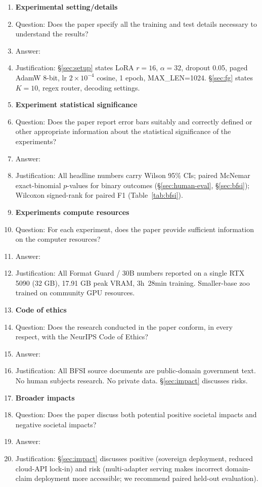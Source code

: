 \documentclass{article}
\begin{document}
\begin{enumerate}
\item {\bf Experimental setting/details}
    \item[] Question: Does the paper specify all the training and test details necessary to understand the results?
    \item[] Answer: \answerYes{}
    \item[] Justification: \S\ref{sec:setup} states LoRA $r=16$, $\alpha=32$, dropout 0.05, paged AdamW 8-bit, lr $2\times10^{-4}$ cosine, 1 epoch, MAX\_LEN=1024. \S\ref{sec:fg} states $K=10$, regex router, decoding settings.

\item {\bf Experiment statistical significance}
    \item[] Question: Does the paper report error bars suitably and correctly defined or other appropriate information about the statistical significance of the experiments?
    \item[] Answer: \answerYes{}
    \item[] Justification: All headline numbers carry Wilson 95\% CIs; paired McNemar exact-binomial $p$-values for binary outcomes (\S\ref{sec:human-eval}, \S\ref{sec:bfsi}); Wilcoxon signed-rank for paired F1 (Table~\ref{tab:bfsi}).

\item {\bf Experiments compute resources}
    \item[] Question: For each experiment, does the paper provide sufficient information on the computer resources?
    \item[] Answer: \answerYes{}
    \item[] Justification: All Format Guard / 30B numbers reported on a single RTX 5090 (32 GB), 17.91 GB peak VRAM, 3h~28min training. Smaller-base zoo trained on community GPU resources.

\item {\bf Code of ethics}
    \item[] Question: Does the research conducted in the paper conform, in every respect, with the NeurIPS Code of Ethics?
    \item[] Answer: \answerYes{}
    \item[] Justification: All BFSI source documents are public-domain government text. No human subjects research. No private data. \S\ref{sec:impact} discusses risks.

\item {\bf Broader impacts}
    \item[] Question: Does the paper discuss both potential positive societal impacts and negative societal impacts?
    \item[] Answer: \answerYes{}
    \item[] Justification: \S\ref{sec:impact} discusses positive (sovereign deployment, reduced cloud-API lock-in) and risk (multi-adapter serving makes incorrect domain-claim deployment more accessible; we recommend paired held-out evaluation).


\end{enumerate}
\end{document}
